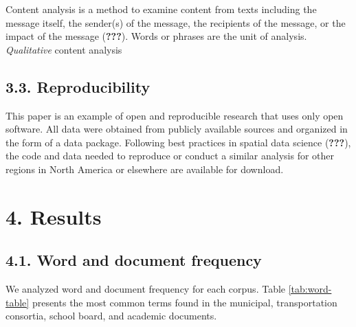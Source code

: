 \documentclass[]{elsarticle} %
\begin{document}
Content analysis is a method to examine content from texts including the
message itself, the sender(s) of the message, the recipients of the
message, or the impact of the message ({\textbf{???}}). Words or phrases
are the unit of analysis. \emph{Qualitative} content analysis

\hypertarget{reproducibility}{%
\subsection{3.3. Reproducibility}\label{reproducibility}}

This paper is an example of open and reproducible research that uses
only open software. All data were obtained from publicly available
sources and organized in the form of a data package. Following best
practices in spatial data science ({\textbf{???}}), the code and data
needed to reproduce or conduct a similar analysis for other regions in
North America or elsewhere are available for download.

\hypertarget{results}{%
\section{4. Results}\label{results}}

\hypertarget{word-and-document-frequency}{%
\subsection{4.1. Word and document
frequency}\label{word-and-document-frequency}}

We analyzed word and document frequency for each corpus. Table
\ref{tab:word-table} presents the most common terms found in the
municipal, transportation consortia, school board, and academic
documents.
\end{document}
